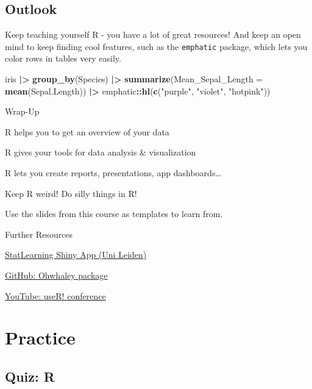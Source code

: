 \documentclass[
]{book}
\newenvironment{Shaded}{\begin{snugshade}}{\end{snugshade}}
\newcommand{\AttributeTok}[1]{\textcolor[rgb]{0.13,0.29,0.53}{#1}}
\newcommand{\FunctionTok}[1]{\textcolor[rgb]{0.13,0.29,0.53}{\textbf{#1}}}
\newcommand{\NormalTok}[1]{#1}
\newcommand{\SpecialCharTok}[1]{\textcolor[rgb]{0.81,0.36,0.00}{\textbf{#1}}}
\newcommand{\StringTok}[1]{\textcolor[rgb]{0.31,0.60,0.02}{#1}}
\begin{document}
\section*{Outlook}\label{outlook}

Keep teaching yourself R - you have a lot of great resources!
And keep an open mind to keep finding cool features, such as the \texttt{emphatic} package, which lets you color rows in tables very easily.

\begin{Shaded}
\begin{Highlighting}[]
\NormalTok{iris }\SpecialCharTok{|\textgreater{}} 
  \FunctionTok{group\_by}\NormalTok{(Species) }\SpecialCharTok{|\textgreater{}} 
  \FunctionTok{summarize}\NormalTok{(}\AttributeTok{Mean\_Sepal\_Length =} \FunctionTok{mean}\NormalTok{(Sepal.Length)) }\SpecialCharTok{|\textgreater{}} 
\NormalTok{  emphatic}\SpecialCharTok{::}\FunctionTok{hl}\NormalTok{(}\FunctionTok{c}\NormalTok{(}\StringTok{"purple"}\NormalTok{, }\StringTok{"violet"}\NormalTok{, }\StringTok{"hotpink"}\NormalTok{))}
\end{Highlighting}
\end{Shaded}

Wrap-Up

R helps you to get an overview of your data

R gives your tools for data analysis \& visualization

R lets you create reports, presentations, app dashboards\ldots{}

Keep R weird! Do silly things in R!

Use the slides from this course as templates to learn from.

Further Resources

\href{https://solo-fsw.shinyapps.io/NewStatLearning/}{StatLearning Shiny App (Uni Leiden)}

\href{https://github.com/fontikar/ohwhaley}{GitHub: Ohwhaley package}

\href{https://www.youtube.com/@useRConference_global}{YouTube: useR! conference}

\chapter*{Practice}\label{practice}

\section{Quiz: R}\label{quiz-r}
\end{document}

